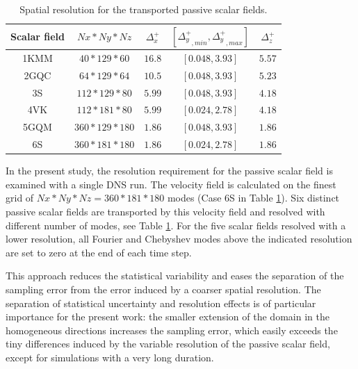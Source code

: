 \documentclass[review]{elsarticle}
\begin{document}
\begin{table}
\begin{center}
\begin{tabular}{|c|c|c|c|c|}
\hline
Scalar field & $Nx*Ny*Nz$ & $\Delta_x^+$ & $\left[{\Delta_y^+}_{,min},{\Delta_y^+}_{,max}\right]$ & $\Delta_z^+$ \\
\hline 1KMM & $40*129*60$ & $16.8$ & $\left[0.048,3.93\right]$ & $5.57$ \\
\hline 2GQC & $64*129*64$ & $10.5$ & $\left[0.048,3.93\right]$ & $5.23$ \\
\hline 3S  & $112*129*80$ & $5.99$ & $\left[0.048,3.93\right]$ & $4.18$ \\
\hline 4VK & $112*181*80$ & $5.99$ & $\left[0.024,2.78\right]$ & $4.18$ \\
\hline 5GQM & $360*129*180$ & $1.86$ & $\left[0.048,3.93\right]$ & $1.86$ \\
\hline 6S & $360*181*180$ & $1.86$ & $\left[0.024,2.78\right]$ & $1.86$ \\
\hline
\end{tabular}
\caption{Spatial resolution for the transported passive scalar fields.}
\label{tb-resolution}
\end{center}
\end{table}

In the present study, the resolution requirement for the passive scalar field is examined with a single DNS run. The velocity field is calculated on the finest grid of $Nx*Ny*Nz = 360*181*180$ modes (Case 6S in Table \ref{tb-resolution}). Six distinct passive scalar fields are transported by this velocity field and resolved with different number of modes, see Table \ref{tb-resolution}. For the five scalar fields resolved with a lower resolution, all Fourier and Chebyshev modes above the indicated resolution are set to zero at the end of each time step.

This approach reduces the statistical variability and eases the separation of the sampling error from the error induced by a coarser spatial resolution. The separation of statistical uncertainty and resolution effects is of particular importance for the present work: the smaller extension of the domain in the homogeneous directions increases the sampling error, which easily exceeds the tiny differences induced by the variable resolution of the passive scalar field, except for simulations with a very long duration.
\end{document}
